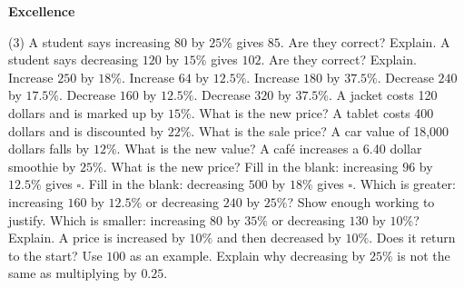 \documentclass[17pt,a4paper,landscape]{extarticle}
\begin{document}
\sffamily
\boldmath

\boldmath

\boldmath

{\LARGE \textbf{Excellence}}
\begin{tasks}(3)
\task A student says increasing \mbox{$80$} by \mbox{$25\%$} gives \mbox{$85$}. Are they correct? Explain.
\task A student says decreasing \mbox{$120$} by \mbox{$15\%$} gives \mbox{$102$}. Are they correct? Explain.
\task Increase \mbox{$250$} by \mbox{$18\%$}.
\task Increase \mbox{$64$} by \mbox{$12.5\%$}.
\task Increase \mbox{$180$} by \mbox{$37.5\%$}.
\task Decrease \mbox{$240$} by \mbox{$17.5\%$}.
\task Decrease \mbox{$160$} by \mbox{$12.5\%$}.
\task Decrease \mbox{$320$} by \mbox{$37.5\%$}.
\task A jacket costs 120 dollars and is marked up by \mbox{$15\%$}. What is the new price?
\task A tablet costs 400 dollars and is discounted by \mbox{$22\%$}. What is the sale price?
\task A car value of 18,000 dollars falls by \mbox{$12\%$}. What is the new value?
\task A café increases a 6.40 dollar smoothie by \mbox{$25\%$}. What is the new price?
\task Fill in the blank: increasing \mbox{$96$} by \mbox{$12.5\%$} gives \mbox{$\square$}.
\task Fill in the blank: decreasing \mbox{$500$} by \mbox{$18\%$} gives \mbox{$\square$}.
\task Which is greater: increasing \mbox{$160$} by \mbox{$12.5\%$} or decreasing \mbox{$240$} by \mbox{$25\%$}? Show enough working to justify.
\task Which is smaller: increasing \mbox{$80$} by \mbox{$35\%$} or decreasing \mbox{$130$} by \mbox{$10\%$}? Explain.
\task A price is increased by \mbox{$10\%$} and then decreased by \mbox{$10\%$}. Does it return to the start? Use \mbox{$100$} as an example.
\task Explain why decreasing by \mbox{$25\%$} is not the same as multiplying by \mbox{$0.25$}.
\end{tasks}
\end{document}
